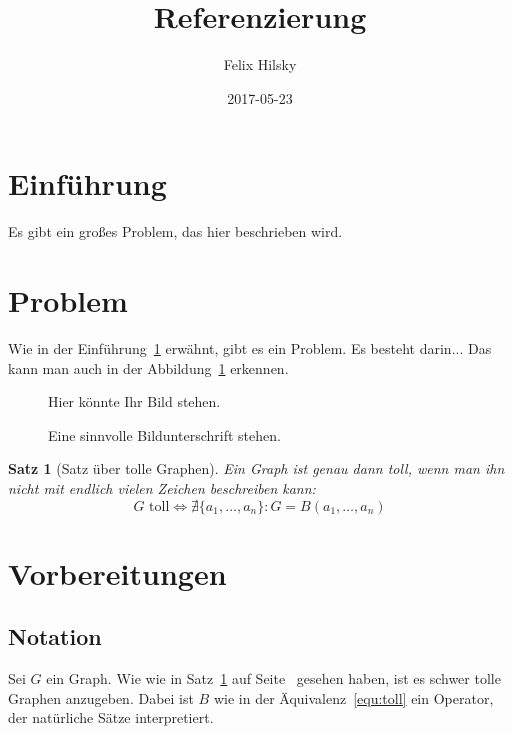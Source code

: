 \documentclass{scrartcl}
\author{Felix Hilsky}
\title{Referenzierung}
\date{2017-05-23}
\newtheorem{thm}{Satz}[section]
\begin{document}
  \maketitle

  \section{Einführung} \label{sec:einfuehrung}
  Es gibt ein großes Problem, das hier beschrieben wird.
  \section{Problem}
  Wie in der Einführung~\ref{sec:einfuehrung} erwähnt, gibt es ein Problem. Es besteht darin... Das kann man auch in der Abbildung~\ref{fig:sinnvollesBild} erkennen.
  \begin{figure}
    Hier könnte Ihr Bild stehen.
    \caption{Eine sinnvolle Bildunterschrift stehen.}
    \label{fig:sinnvollesBild}
  \end{figure}
  \begin{thm}[Satz über tolle Graphen]\label{thm:tollerGraph}
    Ein Graph ist genau dann toll, wenn man ihn nicht mit endlich vielen Zeichen beschreiben kann:
    \begin{equation}
      G \text{ toll} \iff \nexists \{a_1, \dots, a_n\}: G = B(a_1, \dots, a_n)
      \label{equ:toll}
    \end{equation}
  \end{thm}
  \section{Vorbereitungen}
  \subsection{Notation}
  Sei $G$ ein Graph. Wie wie in Satz~\ref{thm:tollerGraph} auf Seite~\pageref{thm:tollerGraph} gesehen haben, ist es schwer tolle Graphen anzugeben. Dabei ist $B$ wie in der Äquivalenz~\eqref{equ:toll} ein Operator, der natürliche Sätze interpretiert.
\end{document}
